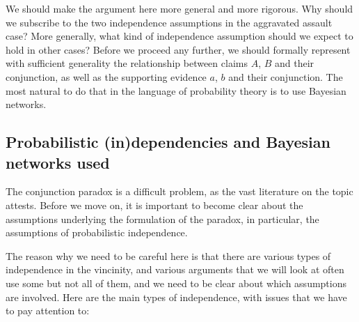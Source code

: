 \documentclass[
  10pt,
  dvipsnames,enabledeprecatedfontcommands]{scrartcl}
\begin{document}
We should make the argument here more general and more rigorous. Why
should we subscribe to the two independence assumptions in the
aggravated assault case? More generally, what kind of independence
assumption should we expect to hold in other cases? Before we proceed
any further, we should formally represent with sufficient generality the
relationship between claims \(A\), \(B\) and their conjunction, as well
as the supporting evidence \(a\), \(b\) and their conjunction. The most
natural to do that in the language of probability theory is to use
Bayesian networks.

\hypertarget{probabilistic-independencies-and-bayesian-networks-used}{%
\subsection{Probabilistic (in)dependencies and Bayesian networks
used}\label{probabilistic-independencies-and-bayesian-networks-used}}

The conjunction paradox is a difficult problem, as the vast literature
on the topic attests. Before we move on, it is important to become clear
about the assumptions underlying the formulation of the paradox, in
particular, the assumptions of probabilistic independence.

The reason why we need to be careful here is that there are various
types of independence in the vincinity, and various arguments that we
will look at often use some but not all of them, and we need to be clear
about which assumptions are involved. Here are the main types of
independence, with issues that we have to pay attention to:
\end{document}
